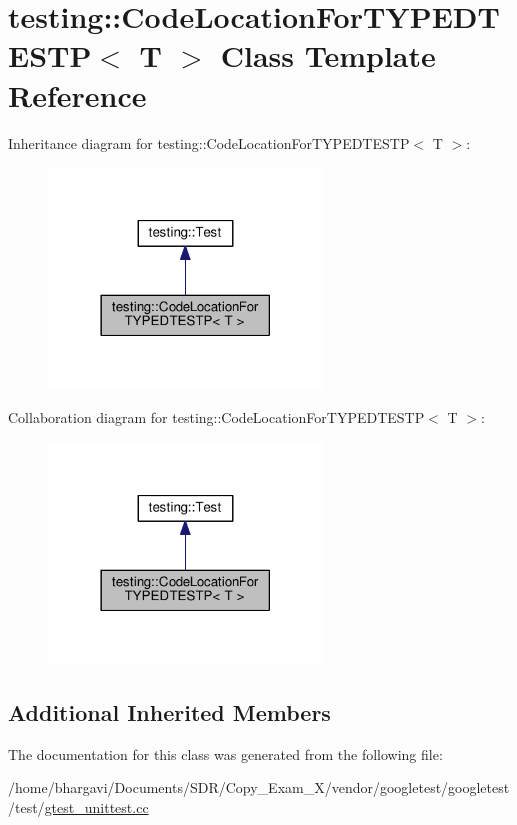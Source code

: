 \hypertarget{classtesting_1_1_code_location_for_t_y_p_e_d_t_e_s_t_p}{}\section{testing\+:\+:Code\+Location\+For\+T\+Y\+P\+E\+D\+T\+E\+S\+TP$<$ T $>$ Class Template Reference}
\label{classtesting_1_1_code_location_for_t_y_p_e_d_t_e_s_t_p}


Inheritance diagram for testing\+:\+:Code\+Location\+For\+T\+Y\+P\+E\+D\+T\+E\+S\+TP$<$ T $>$\+:
\nopagebreak
\begin{figure}[H]
\begin{center}
\leavevmode
\includegraphics[width=206pt]{classtesting_1_1_code_location_for_t_y_p_e_d_t_e_s_t_p__inherit__graph}
\end{center}
\end{figure}


Collaboration diagram for testing\+:\+:Code\+Location\+For\+T\+Y\+P\+E\+D\+T\+E\+S\+TP$<$ T $>$\+:
\nopagebreak
\begin{figure}[H]
\begin{center}
\leavevmode
\includegraphics[width=206pt]{classtesting_1_1_code_location_for_t_y_p_e_d_t_e_s_t_p__coll__graph}
\end{center}
\end{figure}
\subsection*{Additional Inherited Members}


The documentation for this class was generated from the following file\+:\begin{DoxyCompactItemize}
\item 
/home/bhargavi/\+Documents/\+S\+D\+R/\+Copy\+\_\+\+Exam\+\_\+X/vendor/googletest/googletest/test/\hyperlink{gtest__unittest_8cc}{gtest\+\_\+unittest.\+cc}\end{DoxyCompactItemize}
